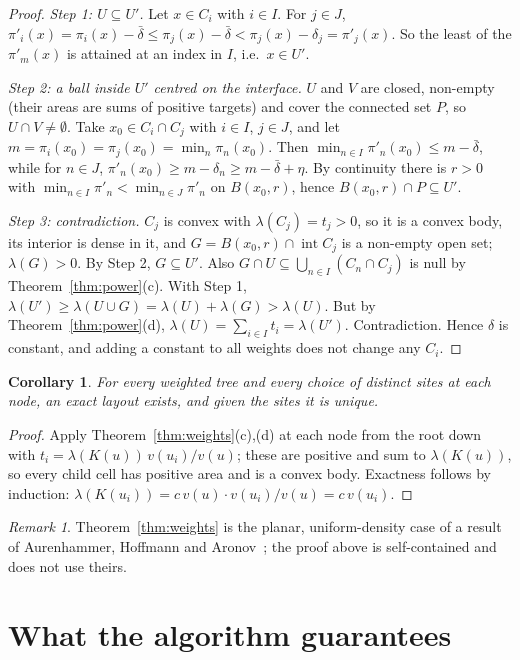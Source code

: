 \documentclass[11pt,a4paper]{article}
\theoremstyle{plain}
\newtheorem{corollary}[theorem]{Corollary}
\theoremstyle{definition}
\theoremstyle{remark}
\newtheorem{remark}[theorem]{Remark}
\newcommand{\area}{\lambda}
\newcommand{\interior}{\operatorname{int}}
\begin{document}
\begin{proof}
\emph{Step 1: $U\subseteq U'$.} Let $x\in C_i$ with $i\in I$. For $j\in J$,
$\pi'_i(x)=\pi_i(x)-\bar\delta\le\pi_j(x)-\bar\delta<\pi_j(x)-\delta_j=\pi'_j(x)$.
So the least of the $\pi'_m(x)$ is attained at an index in $I$, i.e.\ $x\in U'$.

\emph{Step 2: a ball inside $U'$ centred on the interface.} $U$ and $V$ are
closed, non-empty (their areas are sums of positive targets) and cover the
connected set $P$, so $U\cap V\ne\emptyset$. Take $x_0\in C_i\cap C_j$ with
$i\in I$, $j\in J$, and let $m=\pi_i(x_0)=\pi_j(x_0)=\min_n\pi_n(x_0)$. Then
$\min_{n\in I}\pi'_n(x_0)\le m-\bar\delta$, while for $n\in J$,
$\pi'_n(x_0)\ge m-\delta_n\ge m-\bar\delta+\eta$. By continuity there is $r>0$
with $\min_{n\in I}\pi'_n<\min_{n\in J}\pi'_n$ on $B(x_0,r)$, hence
$B(x_0,r)\cap P\subseteq U'$.

\emph{Step 3: contradiction.} $C_j$ is convex with $\area(C_j)=t_j>0$, so it
is a convex body, its interior is dense in it, and
$G=B(x_0,r)\cap\interior C_j$ is a non-empty open set; $\area(G)>0$. By Step 2,
$G\subseteq U'$. Also $G\cap U\subseteq\bigcup_{n\in I}(C_n\cap C_j)$ is null by
Theorem~\ref{thm:power}(c). With Step 1,
$\area(U')\ge\area(U\cup G)=\area(U)+\area(G)>\area(U)$. But by
Theorem~\ref{thm:power}(d), $\area(U)=\sum_{i\in I}t_i=\area(U')$.
Contradiction. Hence $\delta$ is constant, and adding a constant to all
weights does not change any $C_i$.
\end{proof}

\begin{corollary}\label{cor:exact}
For every weighted tree and every choice of distinct sites at each node, an
exact layout exists, and given the sites it is unique.
\end{corollary}
\begin{proof}
Apply Theorem~\ref{thm:weights}(c),(d) at each node from the root down with
$t_i=\area(K(u))\,v(u_i)/v(u)$; these are positive and sum to $\area(K(u))$,
so every child cell has positive area and is a convex body. Exactness follows
by induction: $\area(K(u_i))=c\,v(u)\cdot v(u_i)/v(u)=c\,v(u_i)$.
\end{proof}

\begin{remark}
Theorem~\ref{thm:weights} is the planar, uniform-density case of a result of
Aurenhammer, Hoffmann and Aronov~\cite{AHA}; the proof above is self-contained
and does not use theirs.
\end{remark}

\section{What the algorithm guarantees}
\end{document}
